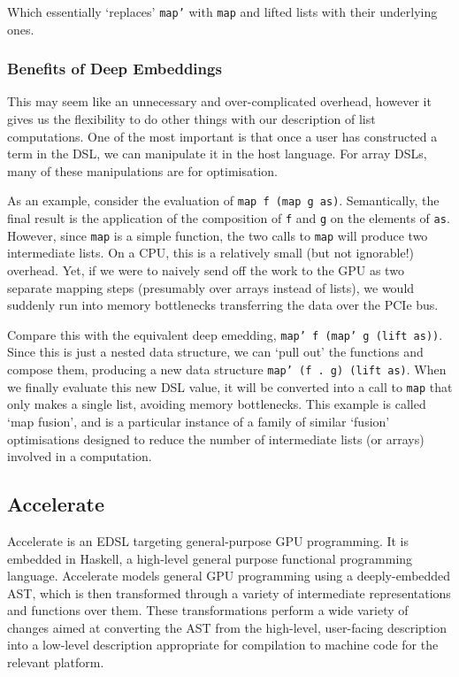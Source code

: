 \documentclass[a4paper,12pt]{article}
\newcommand{\icf}[1]{\mbox{\texttt{#1}}} %
\begin{document}
Which essentially `replaces' \icf{map'} with \icf{map} and lifted lists with their underlying ones.

\subsubsection*{Benefits of Deep Embeddings}
This may seem like an unnecessary and over-complicated overhead, however it gives us the flexibility to do other things with our description of list computations. 
One of the most important is that once a user has constructed a term in the DSL, we can manipulate it in the host language. 
For array DSLs, many of these manipulations are for optimisation.

As an example, consider the evaluation of \icf{map\ f\ (map\ g\ as)}. 
Semantically, the final result is the application of the composition of \icf{f} and \icf{g} on the elements of \icf{as}. 
However, since \icf{map} is a simple function, the two calls to \icf{map} will produce two intermediate lists. 
On a CPU, this is a relatively small (but not ignorable!) overhead. \citep{rompf_optimizing_2013}
Yet, if we were to naively send off the work to the GPU as two separate mapping steps (presumably over arrays instead of lists), we would suddenly run into memory bottlenecks transferring the data over the PCIe bus.

Compare this with the equivalent deep emedding, \icf{map'\ f\ (map'\ g\ (lift\ as))}. 
Since this is just a nested data structure, we can `pull out' the functions and compose them, producing a new data structure \icf{map'\ (f\ .\ g)\ (lift\ as)}.
When we finally evaluate this new DSL value, it will be converted into a call to \icf{map} that only makes a single list, avoiding memory bottlenecks.
This example is called `map fusion', and is a particular instance of a family of similar `fusion' optimisations designed to reduce the number of intermediate lists (or arrays) involved in a computation.

\subsection{Accelerate}

Accelerate is an EDSL targeting general-purpose GPU programming. 
It is embedded in Haskell, a high-level general purpose functional programming language.
Accelerate models general GPU programming using a deeply-embedded AST, which is then transformed through a variety of intermediate representations and functions over them.
These transformations perform a wide variety of changes aimed at converting the AST from the high-level, user-facing description into a low-level description appropriate for compilation to machine code for the relevant platform.
\end{document}
